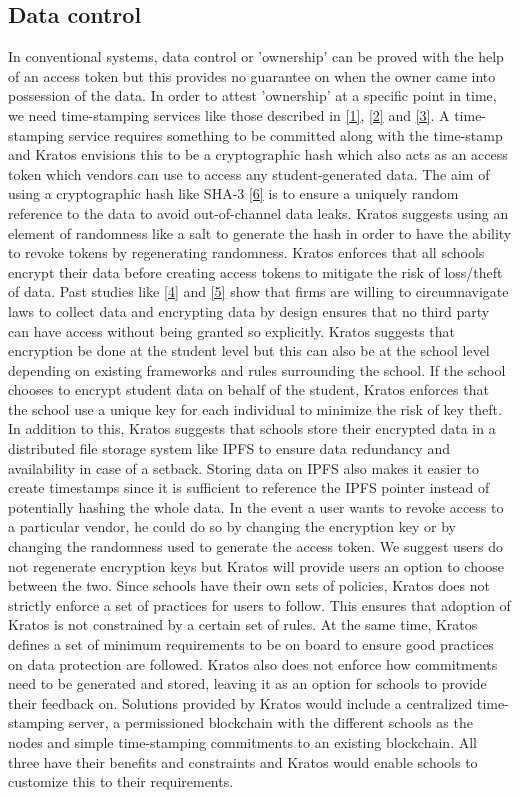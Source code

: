 \documentclass{article}
\begin{document}
\subsection{Data control}
In conventional systems, data control or 'ownership' can be proved with the help of an access token but this provides no guarantee on when the owner came into possession of the data. In order to attest 'ownership' at a specific point in time, we need time-stamping services like those described in \hyperref[sec:1]{[1]}, \hyperref[sec:2]{[2]} and \hyperref[sec:3]{[3]}. A time-stamping service requires something to be committed along with the time-stamp and Kratos envisions this to be a cryptographic hash which also acts as an access token which vendors can use to access any student-generated data.
\bigbreak
The aim of using a cryptographic hash like SHA-3 \hyperref[sec:6]{[6]} is to ensure a uniquely random reference to the data to avoid out-of-channel data leaks. Kratos suggests using an element of randomness like a salt to generate the hash in order to have the ability to revoke tokens by regenerating randomness. Kratos enforces that all schools encrypt their data before creating access tokens to mitigate the risk of loss/theft of data. Past studies like \hyperref[sec:4]{[4]} and \hyperref[sec:5]{[5]} show that firms are willing to circumnavigate laws to collect data and encrypting data by design ensures that no third party can have access without being granted so explicitly.
\bigbreak
Kratos suggests that encryption be done at the student level but this can also be at the school level depending on existing frameworks and rules surrounding the school. If the school chooses to encrypt student data on behalf of the student, Kratos enforces that the school use a unique key for each individual to minimize the risk of key theft. In addition to this, Kratos suggests that schools store their encrypted data in a distributed file storage system like IPFS to ensure data redundancy and availability in case of a setback. Storing data on IPFS also makes it easier to create timestamps since it is sufficient to reference the IPFS pointer instead of potentially hashing the whole data.
\bigbreak
In the event a user wants to revoke access to a particular vendor, he could do so by changing the encryption key or by changing the randomness used to generate the access token. We suggest users do not regenerate encryption keys but Kratos will provide users an option to choose between the two.
\bigbreak
Since schools have their own sets of policies, Kratos does not strictly enforce a set of practices for users to follow. This ensures that adoption of Kratos is not constrained by a certain set of rules. At the same time, Kratos defines a set of minimum requirements to be on board to ensure good practices on data protection are followed.
\bigbreak
Kratos also does not enforce how commitments need to be generated and stored, leaving it as an option for schools to provide their feedback on. Solutions provided by Kratos would include a centralized time-stamping server, a permissioned blockchain with the different schools as the nodes and simple time-stamping commitments to an existing blockchain. All three have their benefits and constraints and Kratos would enable schools to customize this to their requirements.
\bigbreak
\end{document}
